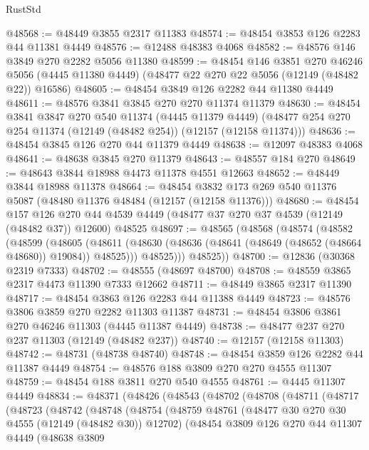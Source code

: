 \begin{lexlean}{RustStd}
\begin{coremodule}
@48568 := @48449 @3855 @2317 @11383
@48574 := @48454 @3853 @126 @2283 @44 @11381 @4449
@48576 := @12488 @48383 @4068
@48582 := @48576 @146 @3849 @270 @2282 @5056 @11380
@48599 := @48454
    @146
    @3851
    @270
    @46246
    @5056
    (@4445 @11380 @4449)
    (@48477 @22 @270 @22 @5056 (@12149 (@48482 @22)) @16586)
@48605 := @48454 @3849 @126 @2282 @44 @11380 @4449
@48611 := @48576 @3841 @3845 @270 @270 @11374 @11379
@48630 := @48454
    @3841
    @3847
    @270
    @540
    @11374
    (@4445 @11379 @4449)
    (@48477 @254 @270 @254 @11374 (@12149 (@48482 @254)) (@12157 (@12158 @11374)))
@48636 := @48454 @3845 @126 @270 @44 @11379 @4449
@48638 := @12097 @48383 @4068
@48641 := @48638 @3845 @270 @11379
@48643 := @48557 @184 @270
@48649 := @48643 @3844 @18988 @4473 @11378 @4551 @12663
@48652 := @48449 @3844 @18988 @11378
@48664 := @48454 @3832 @173 @269 @540 @11376 @5087 (@48480 @11376 @48484 (@12157 (@12158 @11376)))
@48680 := @48454
    @157
    @126
    @270
    @44
    @4539
    @4449
    (@48477 @37 @270 @37 @4539 (@12149 (@48482 @37)) @12600)
    @48525
@48697 := @48565
    (@48568
      (@48574
        (@48582
          (@48599
            (@48605
              (@48611 (@48630 (@48636 (@48641 (@48649 (@48652 (@48664 @48680)) @19084)) @48525)))
              @48525)))
        @48525))
@48700 := @12836 (@30368 @2319 @7333)
@48702 := @48555 (@48697 @48700)
@48708 := @48559 @3865 @2317 @4473 @11390 @7333 @12662
@48711 := @48449 @3865 @2317 @11390
@48717 := @48454 @3863 @126 @2283 @44 @11388 @4449
@48723 := @48576 @3806 @3859 @270 @2282 @11303 @11387
@48731 := @48454 @3806 @3861 @270 @46246 @11303 (@4445 @11387 @4449)
@48738 := @48477 @237 @270 @237 @11303 (@12149 (@48482 @237))
@48740 := @12157 (@12158 @11303)
@48742 := @48731 (@48738 @48740)
@48748 := @48454 @3859 @126 @2282 @44 @11387 @4449
@48754 := @48576 @188 @3809 @270 @270 @4555 @11307
@48759 := @48454 @188 @3811 @270 @540 @4555
@48761 := @4445 @11307 @4449
@48834 := @48371
    (@48426
      (@48543
        (@48702
          (@48708
            (@48711
              (@48717
                (@48723
                  (@48742
                    (@48748
                      (@48754
                        (@48759
                          @48761
                          (@48477 @30 @270 @30 @4555 (@12149 (@48482 @30)) @12702)
                          (@48454
                            @3809
                            @126
                            @270
                            @44
                            @11307
                            @4449
                            (@48638
                              @3809

\end{coremodule}
\end{lexlean}
